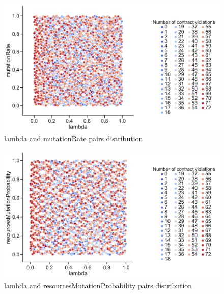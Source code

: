\begin{figure}
	\centering
	\includegraphics[width=\textwidth]{images/PairsDistr/lambda_mutationRate.pdf}
	\caption[lambda and mutationRate pairs distribution]{lambda and mutationRate pairs distribution}
	\label{fig:lambda_mutationRate_pair}
\end{figure}
\begin{figure}
	\centering
	\includegraphics[width=\textwidth]{images/PairsDistr/lambda_resourcesMutationProbability.pdf}
	\caption[lambda and resourcesMutationProbability pairs distribution]{lambda and resourcesMutationProbability pairs distribution}
	\label{fig:lambda_resourcesMutationProbability_pair}
\end{figure}
